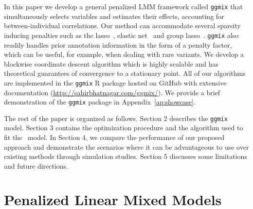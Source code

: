 In this paper we develop a general penalized LMM framework called \texttt{ggmix} that simultaneously selects variables and estimates their effects, accounting for between-individual correlations. 
Our method can accommodate several sparsity inducing penalties such as the lasso~\citep{tibshirani1996regression}, elastic net~\citep{zou2005regularization} and group lasso~\citep{yuan2006model}. 
\texttt{ggmix} also readily handles prior annotation information in the form of a penalty factor, which can be useful, for example, when dealing with rare variants. 
We develop a blockwise coordinate descent algorithm which is highly scalable and has theoretical guarantees of convergence to a stationary point.
All of our algorithms are implemented in the \texttt{ggmix} R package hosted on GitHub with extensive documentation (\url{http://sahirbhatnagar.com/ggmix/}). We provide a brief demonstration of the \texttt{ggmix} package in Appendix~\ref{ap:showcase}.

The rest of the paper is organized as follows. Section 2 describes the \texttt{ggmix} model. 
Section 3 contains the optimization procedure and the algorithm used to fit the \ggmix ~model. 
In Section 4, we compare the performance of our proposed approach and demonstrate the scenarios where it can be advantageous to use over existing methods through simulation studies. 
Section 5 discusses some limitations and future directions.

\section{Penalized Linear Mixed Models}



